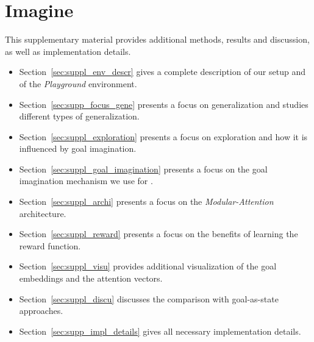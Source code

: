 
\chapter{Imagine}

This supplementary material provides additional methods, results and discussion, as well as implementation details.

\begin{itemize}[nolistsep]
    \item Section~\ref{sec:suppl_env_descr} gives a complete description of our setup and of the \textit{Playground} environment.
    \item Section~\ref{sec:supp_focus_gene} presents a focus on generalization and studies different types of generalization.
    \item Section~\ref{sec:suppl_exploration} presents a focus on exploration and how it is influenced by goal imagination.
    \item Section~\ref{sec:suppl_goal_imagination} presents a focus on the goal imagination mechanism we use for \imagine.
    \item Section~\ref{sec:suppl_archi} presents a focus on the \textit{Modular-Attention} architecture.
    \item Section~\ref{sec:suppl_reward} presents a focus on the benefits of learning the reward function.
    \item Section~\ref{sec:suppl_visu} provides additional visualization of the goal embeddings and the attention vectors.
    \item Section~\ref{sec:suppl_discu} discusses the comparison with goal-as-state approaches.
    \item Section~\ref{sec:supp_impl_details} gives all necessary implementation details.
\end{itemize}









